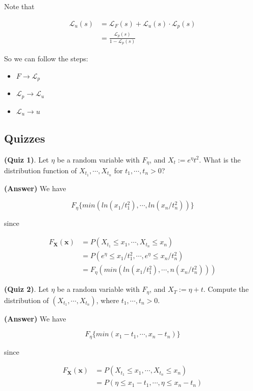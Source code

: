 \documentclass[12pt]{article}
\theoremstyle{nonumberbreak}
\begin{document}
Note that 

$$
\begin{aligned}
\mathcal{L}_u (s) &= \mathcal{L}_F (s) + \mathcal{L}_u (s) \cdot \mathcal{L}_p (s) \\[8pt]
&= \frac{\mathcal{L}_p(s)}{1-\mathcal{L}_p(s)}
\end{aligned}
$$


So we can follow the steps:

\begin{itemize}
	\item $F \to \mathcal{L}_p$
	\item $\mathcal{L}_p \to \mathcal{L}_u$
	\item $\mathcal{L}_u \to u$
\end{itemize}


\subsection*{Quizzes}

\textbf{(Quiz 1)}. Let $\eta$ be a random variable with $F_\eta$, and $X_t := e^\eta t^2$. What is the distribution function of $X_{t_1}, \cdots, X_{t_n}$ for $t_1, \cdots, t_n >0$? 

\textbf{(Answer)} We have

$$
F_{\eta} \{ min \left( ln(x_1/t_1^2), \cdots, ln(x_n/t_n^2) \right) \}
$$

since

$$
\begin{aligned}
F_\mathbf{X} (\mathbf{x}) &= P(X_{t_1} \le x_1, \cdots, X_{t_n} \le x_n) \\[8pt]
&= P(e^\eta  \le x_1/t_1^2, \cdots, e^\eta  \le x_n/t_n^2)  \\[8pt]
&= F_\eta (min (ln(x_1/t_1^2), \cdots, n(x_n/t_n^2)))
\end{aligned}
$$


\textbf{(Quiz 2)}. Let $\eta$ be a random variable with $F_\eta$, and $X_T := \eta + t$. Compute the distribution of $(X_{t_1}, \cdots, X_{t_n})$, where $t_1, \cdots, t_n >0$. 

\textbf{(Answer)} We have

$$
F_{\eta} \{ min \left( x_1 - t_1, \cdots, x_n - t_n \right) \}
$$

since

$$
\begin{aligned}
F_\mathbf{X} (\mathbf{x}) &= P(X_{t_1} \le x_1, \cdots, X_{t_n} \le x_n) \\[8pt]
&= P(\eta \le x_1 - t_1, \cdots, \eta \le x_n - t_n)
\end{aligned}
$$
\end{document}
